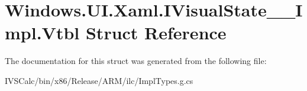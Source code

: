 \hypertarget{struct_windows_1_1_u_i_1_1_xaml_1_1_i_visual_state_____impl_1_1_vtbl}{}\section{Windows.\+U\+I.\+Xaml.\+I\+Visual\+State\+\_\+\+\_\+\+Impl.\+Vtbl Struct Reference}
\label{struct_windows_1_1_u_i_1_1_xaml_1_1_i_visual_state_____impl_1_1_vtbl}


The documentation for this struct was generated from the following file\+:\begin{DoxyCompactItemize}
\item 
I\+V\+S\+Calc/bin/x86/\+Release/\+A\+R\+M/ilc/Impl\+Types.\+g.\+cs\end{DoxyCompactItemize}

